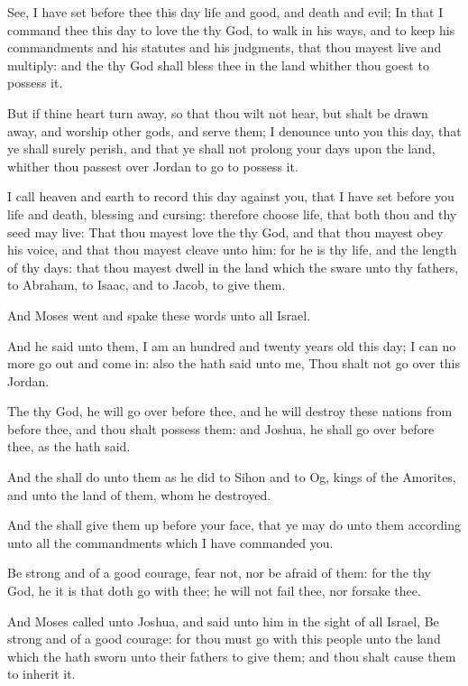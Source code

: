 \Verse See, I have set before thee this day life and good, and death and evil; \Verse In that I command thee this day to love the \LORD thy God, to walk in his ways, and to keep his commandments and his statutes and his judgments, that thou mayest live and multiply: and the \LORD thy God shall bless thee in the land whither thou goest to possess it.

\Verse But if thine heart turn away, so that thou wilt not hear, but shalt be drawn away, and worship other gods, and serve them; \Verse I denounce unto you this day, that ye shall surely perish, and that ye shall not prolong your days upon the land, whither thou passest over Jordan to go to possess it.

\Verse I call heaven and earth to record this day against you, that I have set before you life and death, blessing and cursing: therefore choose life, that both thou and thy seed may live: \Verse That thou mayest love the \LORD thy God, and that thou mayest obey his voice, and that thou mayest cleave unto him: for he is thy life, and the length of thy days: that thou mayest dwell in the land which the \LORD sware unto thy fathers, to Abraham, to Isaac, and to Jacob, to give them.


\Chapter
\Verse And Moses went and spake these words unto all Israel.

\Verse And he said unto them, I am an hundred and twenty years old this day; I can no more go out and come in: also the \LORD hath said unto me, Thou shalt not go over this Jordan.

\Verse The \LORD thy God, he will go over before thee, and he will destroy these nations from before thee, and thou shalt possess them: and Joshua, he shall go over before thee, as the \LORD hath said.

\Verse And the \LORD shall do unto them as he did to Sihon and to Og, kings of the Amorites, and unto the land of them, whom he destroyed.

\Verse And the \LORD shall give them up before your face, that ye may do unto them according unto all the commandments which I have commanded you.

\Verse Be strong and of a good courage, fear not, nor be afraid of them: for the \LORD thy God, he it is that doth go with thee; he will not fail thee, nor forsake thee.

\Verse And Moses called unto Joshua, and said unto him in the sight of all Israel, Be strong and of a good courage: for thou must go with this people unto the land which the \LORD hath sworn unto their fathers to give them; and thou shalt cause them to inherit it.

